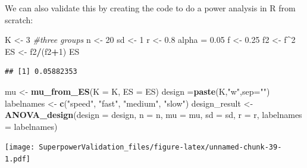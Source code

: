\documentclass[]{book}
\newenvironment{Shaded}{\begin{snugshade}}{\end{snugshade}}
\newcommand{\CommentTok}[1]{\textcolor[rgb]{0.56,0.35,0.01}{\textit{#1}}}
\newcommand{\DataTypeTok}[1]{\textcolor[rgb]{0.13,0.29,0.53}{#1}}
\newcommand{\DecValTok}[1]{\textcolor[rgb]{0.00,0.00,0.81}{#1}}
\newcommand{\FloatTok}[1]{\textcolor[rgb]{0.00,0.00,0.81}{#1}}
\newcommand{\KeywordTok}[1]{\textcolor[rgb]{0.13,0.29,0.53}{\textbf{#1}}}
\newcommand{\NormalTok}[1]{#1}
\newcommand{\OperatorTok}[1]{\textcolor[rgb]{0.81,0.36,0.00}{\textbf{#1}}}
\newcommand{\StringTok}[1]{\textcolor[rgb]{0.31,0.60,0.02}{#1}}
\begin{document}
We can also validate this by creating the code to do a power analysis in R from scratch:

\begin{Shaded}
\begin{Highlighting}[]
\NormalTok{K <-}\StringTok{ }\DecValTok{3} \CommentTok{#three groups}
\NormalTok{n <-}\StringTok{ }\DecValTok{20}
\NormalTok{sd <-}\StringTok{ }\DecValTok{1}
\NormalTok{r <-}\StringTok{ }\FloatTok{0.8}
\NormalTok{alpha =}\StringTok{ }\FloatTok{0.05}
\NormalTok{f <-}\StringTok{ }\FloatTok{0.25}
\NormalTok{f2 <-}\StringTok{ }\NormalTok{f}\OperatorTok{^}\DecValTok{2}
\NormalTok{ES <-}\StringTok{ }\NormalTok{f2}\OperatorTok{/}\NormalTok{(f2}\OperatorTok{+}\DecValTok{1}\NormalTok{)}
\NormalTok{ES}
\end{Highlighting}
\end{Shaded}

\begin{verbatim}
## [1] 0.05882353
\end{verbatim}

\begin{Shaded}
\begin{Highlighting}[]
\NormalTok{mu <-}\StringTok{ }\KeywordTok{mu_from_ES}\NormalTok{(}\DataTypeTok{K =}\NormalTok{ K, }\DataTypeTok{ES =}\NormalTok{ ES)}
\NormalTok{design =}\KeywordTok{paste}\NormalTok{(K,}\StringTok{"w"}\NormalTok{,}\DataTypeTok{sep=}\StringTok{""}\NormalTok{)}
\NormalTok{labelnames <-}\StringTok{ }\KeywordTok{c}\NormalTok{(}\StringTok{"speed"}\NormalTok{, }\StringTok{"fast"}\NormalTok{, }\StringTok{"medium"}\NormalTok{, }\StringTok{"slow"}\NormalTok{)}
\NormalTok{design_result <-}\StringTok{ }\KeywordTok{ANOVA_design}\NormalTok{(}\DataTypeTok{design =}\NormalTok{ design,}
                   \DataTypeTok{n =}\NormalTok{ n, }
                   \DataTypeTok{mu =}\NormalTok{ mu, }
                   \DataTypeTok{sd =}\NormalTok{ sd, }
                   \DataTypeTok{r =}\NormalTok{ r, }
                   \DataTypeTok{labelnames =}\NormalTok{ labelnames)}
\end{Highlighting}
\end{Shaded}

\texttt{[image: SuperpowerValidation\_files/figure-latex/unnamed-chunk-39-1.pdf]}

\begin{Shaded}
\end{Shaded}
\end{document}
